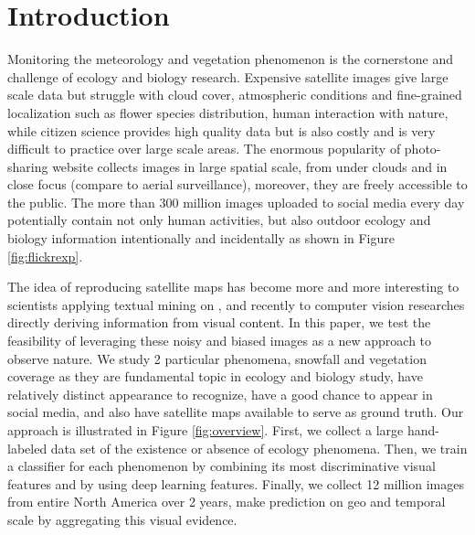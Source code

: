 \documentclass[10pt]{article}
\begin{document}
\section{Introduction}

Monitoring the meteorology and vegetation phenomenon is the cornerstone and challenge of ecology and biology research. Expensive satellite images give large scale data but struggle with cloud cover, 
atmospheric conditions and fine-grained localization such as flower species distribution, human interaction with nature,
while citizen science provides high quality data but is also costly and is very difficult to practice over large scale areas.
The enormous popularity of photo-sharing website collects images in large spatial scale, from under clouds and in close focus (compare to aerial surveillance), 
moreover, they are freely accessible to the public.
The more than 300 million images uploaded to social media every day
\cite{https://zephoria.com/top-15-valuable-facebook-statistics/}
 potentially contain not only human activities, but also outdoor ecology and biology information intentionally and incidentally as shown in Figure \ref{fig:flickrexp}.

The idea of reproducing satellite maps has become more and more interesting to scientists applying textual mining on , 
and recently to computer vision researches directly deriving  information from visual content.
In this paper, we test the feasibility of leveraging these noisy and biased images as a new approach to observe nature. We study 2 particular phenomena, snowfall and vegetation coverage as they are fundamental topic in ecology and biology study, have relatively distinct appearance to recognize, have a good chance to appear in social media, and also have satellite maps available to serve as ground truth. Our approach is illustrated in Figure \ref{fig:overview}. 
First, we collect a large hand-labeled data set of the existence or absence of ecology phenomena. 
Then, we train a classifier for each phenomenon by combining its most discriminative visual features and by using deep learning features. 
Finally, we collect 12 million images from entire North America over 2 years, make prediction on geo and temporal scale by aggregating this visual evidence.
\end{document}
